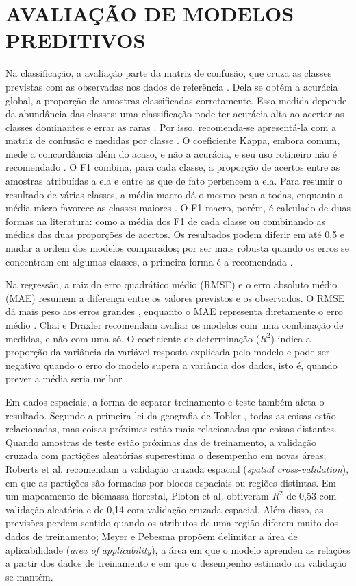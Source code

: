 \section{AVALIAÇÃO DE MODELOS PREDITIVOS}
\label{sec:avaliacao-modelos}

Na classificação, a avaliação parte da matriz de confusão, que cruza as classes previstas com as observadas nos dados de referência \cite{foody2002}. Dela se obtém a acurácia global, a proporção de amostras classificadas corretamente. Essa medida depende da abundância das classes: uma classificação pode ter acurácia alta ao acertar as classes dominantes e errar as raras \cite{foody2020}. Por isso, recomenda-se apresentá-la com a matriz de confusão e medidas por classe \cite{olofsson2014}. O coeficiente Kappa, embora comum, mede a concordância além do acaso, e não a acurácia, e seu uso rotineiro não é recomendado \cite{foody2020}. O F1 combina, para cada classe, a proporção de acertos entre as amostras atribuídas a ela e entre as que de fato pertencem a ela. Para resumir o resultado de várias classes, a média macro dá o mesmo peso a todas, enquanto a média micro favorece as classes maiores \cite{sokolova2009}. O F1 macro, porém, é calculado de duas formas na literatura: como a média dos F1 de cada classe ou combinando as médias das duas proporções de acertos. Os resultados podem diferir em até 0,5 e mudar a ordem dos modelos comparados; por ser mais robusta quando os erros se concentram em algumas classes, a primeira forma é a recomendada \cite{opitz2021}.

Na regressão, a raiz do erro quadrático médio (RMSE) e o erro absoluto médio (MAE) resumem a diferença entre os valores previstos e os observados. O RMSE dá mais peso aos erros grandes \cite{chai2014}, enquanto o MAE representa diretamente o erro médio \cite{willmott2005}. Chai e Draxler \cite{chai2014} recomendam avaliar os modelos com uma combinação de medidas, e não com uma só. O coeficiente de determinação ($R^2$) indica a proporção da variância da variável resposta explicada pelo modelo e pode ser negativo quando o erro do modelo supera a variância dos dados, isto é, quando prever a média seria melhor \cite{chicco2021}.

Em dados espaciais, a forma de separar treinamento e teste também afeta o resultado. Segundo a primeira lei da geografia de Tobler \cite[p.~236]{tobler1970}, todas as coisas estão relacionadas, mas coisas próximas estão mais relacionadas que coisas distantes. Quando amostras de teste estão próximas das de treinamento, a validação cruzada com partições aleatórias superestima o desempenho em novas áreas; Roberts et al. \cite{roberts2017} recomendam a validação cruzada espacial (\textit{spatial cross-validation}), em que as partições são formadas por blocos espaciais ou regiões distintas. Em um mapeamento de biomassa florestal, Ploton et al. \cite{ploton2020} obtiveram $R^2$ de 0,53 com validação aleatória e de 0,14 com validação cruzada espacial. Além disso, as previsões perdem sentido quando os atributos de uma região diferem muito dos dados de treinamento; Meyer e Pebesma \cite{meyer2021} propõem delimitar a área de aplicabilidade (\textit{area of applicability}), a área em que o modelo aprendeu as relações a partir dos dados de treinamento e em que o desempenho estimado na validação se mantém.
